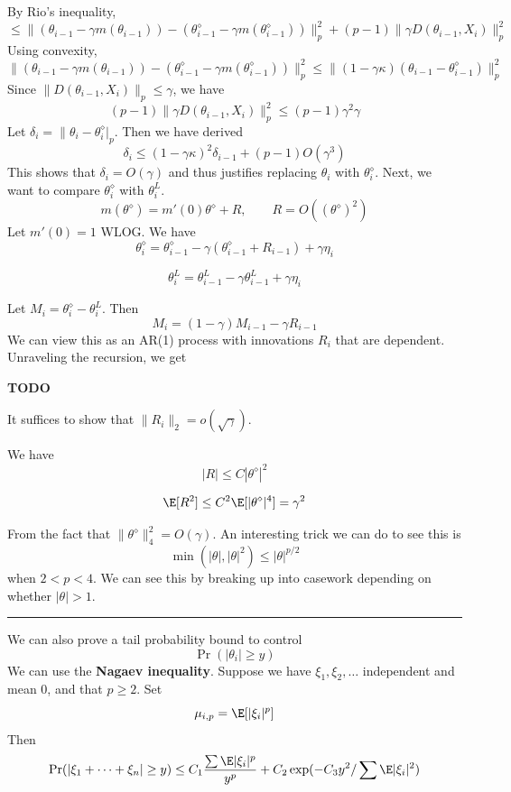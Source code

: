 By Rio's inequality,
\[\leq \| (\theta_{i-1} - \gamma m(\theta_{i-1})) - (\theta_{i-1}^\diamond - \gamma m(\theta_{i-1}^\diamond))\|_p^2 + (p - 1)\|\gamma D(\theta_{i-1}, X_i)\|_p^2\]
Using convexity,
\[\| (\theta_{i-1} - \gamma m(\theta_{i-1})) - (\theta_{i-1}^\diamond - \gamma m(\theta_{i-1}^\diamond))\|_p^2 \leq \|(1 - \gamma \kappa)(\theta_{i-1} - \theta_{i-1}^\diamond)\|_p^2\]
Since \(\|D(\theta_{i-1}, X_i)\|_p \leq \gamma\), we have
\[(p - 1)\|\gamma D(\theta_{i-1}, X_i)\|_p^2 \leq (p - 1)\gamma^2 \gamma\]
Let \(\delta_i = \|\theta_i - \theta_i^\diamond|_p\). Then we have derived
\[\delta_i \leq (1 - \gamma \kappa)^2 \delta_{i-1} + (p - 1)O(\gamma^3)\]
This shows that \(\delta_i = O(\gamma)\) and thus justifies replacing \(\theta_i\) with \(\theta_i^\diamond\). Next, we want to compare \(\theta_i^\diamond\) with \(\theta_i^L\).
\[m(\theta^\diamond) = m'(0)\theta^\diamond + R, \qquad R = O((\theta^\diamond)^2)\]
Let \(m'(0) = 1\) WLOG. We have
\[\theta_i^\diamond = \theta_{i-1}^\diamond - \gamma(\theta_{i-1}^\diamond + R_{i-1}) + \gamma \eta_i\]

\[\theta_i^L = \theta_{i-1}^L - \gamma \theta_{i-1}^L + \gamma \eta_i\]

Let \(M_i = \theta_i^\diamond - \theta_i^L\). Then
\[M_i = (1 - \gamma)M_{i-1} - \gamma R_{i-1}\]
We can view this as an AR(1) process with innovations \(R_i\) that are dependent. Unraveling the recursion, we get

\textbf{TODO}

It suffices to show that \(\|R_i\|_2 = o(\sqrt \gamma)\).

We have
\[|R| \leq C |\theta^\diamond|^2\]

\[\E[R^2] \leq C^2 \E[|\theta^\diamond|^4] = \gamma^2\]

From the fact that \(\|\theta^\diamond\|_4^2 = O(\gamma)\). An interesting trick we can do to see this is
\[\min(|\theta|, |\theta|^2) \leq |\theta|^{p/2}\]
when \(2 < p < 4\). We can see this by breaking up into casework depending on whether \(|\theta| > 1\).

\begin{center}\rule{0.5\linewidth}{0.5pt}\end{center}

We can also prove a tail probability bound to control
\[\Pr(|\theta_i| \geq y)\]
We can use the \textbf{Nagaev inequality}. Suppose we have \(\xi_1, \xi_2, \dots\) independent and mean \(0\), and that \(p \geq 2\). Set
\[\mu_{i,p} = \E[|\xi_i|^p]\]
Then
\[\Pr(|\xi_1 + \cdots + \xi_n| \geq y) \leq C_1 \frac{\sum \E|\xi_i|^p}{y^p} + C_2 \exp(-C_3 y^2 / \sum \E|\xi_i|^2)\]

